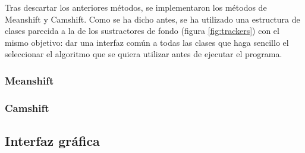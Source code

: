 Tras descartar los anteriores métodos, se implementaron los métodos de Meanshift y Camshift. Como se ha dicho antes, se ha utilizado una estructura de clases parecida a la de los sustractores de fondo (figura \ref{fig:trackers}) con el mismo objetivo: dar una interfaz común a todas las clases que haga sencillo el seleccionar el algoritmo que se quiera utilizar antes de ejecutar el programa.

\subsubsection*{Meanshift}

\subsubsection*{Camshift}

\subsection{Interfaz gráfica}


